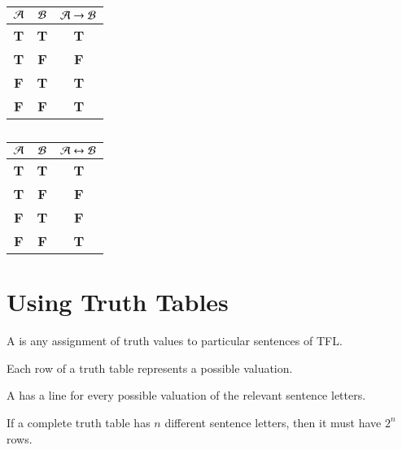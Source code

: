 \begin{table}[H]
    \centering
    \caption{}
    \begin{tabular}{cc|c}
        $\mathcal{A}$ & $\mathcal{B}$ & $\mathcal{A} \rightarrow \mathcal{B}$ \\ \hline
        \textbf{T} & \textbf{T} & \textbf{T} \\
        \textbf{T} & \textbf{F} & \textbf{F} \\
        \textbf{F} & \textbf{T} & \textbf{T} \\
        \textbf{F} & \textbf{F} & \textbf{T}
    \end{tabular}
\end{table}


\begin{table}[H]
    \centering
    \caption{}
    \begin{tabular}{cc|c}
        $\mathcal{A}$ & $\mathcal{B}$ & $\mathcal{A} \leftrightarrow \mathcal{B}$\\ \hline
        \textbf{T} & \textbf{T} & \textbf{T} \\
        \textbf{T} & \textbf{F} & \textbf{F} \\
        \textbf{F} & \textbf{T} & \textbf{F} \\
        \textbf{F} & \textbf{F} & \textbf{T}
    \end{tabular}
\end{table}

\section{ Using Truth Tables}

\begin{definition}
    A  is any assignment of truth values to particular sentences of TFL.
\end{definition}

\begin{remark}
    Each row of a truth table represents a possible valuation.
\end{remark}

\begin{definition}
    A  has a line for every possible valuation of the relevant sentence letters.
\end{definition}


\begin{proposition}
    If a complete truth table has $n$ different sentence letters, then it must have $2^n$ rows.
\end{proposition}


